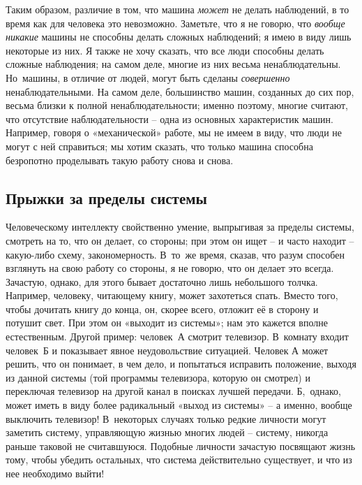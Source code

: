\documentclass[../main.tex]{subfiles}
\begin{document}
Таким образом, различие в том, что машина \emph{может} не делать наблюдений, в то время как для человека это невозможно. Заметьте, что я не говорю, что \emph{вообще никакие} машины не способны делать сложных наблюдений; я имею в виду лишь некоторые из них. Я также не хочу сказать, что все люди способны делать сложные наблюдения; на самом деле, многие из них весьма ненаблюдательны. Но~машины, в отличие от людей, могут быть сделаны \emph{совершенно} ненаблюдательными. На самом деле, большинство машин, созданных до сих пор, весьма близки к полной ненаблюдательности; именно поэтому, многие считают, что отсутствие наблюдательности \--- одна из основных характеристик машин. Например, говоря о «механической» работе, мы не имеем в виду, что люди не могут с ней справиться; мы хотим сказать, что только машина способна безропотно проделывать такую работу снова и снова.


\subsection{Прыжки за пределы системы}

Человеческому интеллекту свойственно умение, выпрыгивая за пределы системы, смотреть на то, что он делает, со стороны; при этом он ищет \--- и часто находит \--- какую-либо схему, закономерность. В~то~же время, сказав, что разум способен взглянуть на свою работу со стороны, я не говорю, что он делает это всегда. Зачастую, однако, для этого бывает достаточно лишь небольшого толчка. Например, человеку, читающему книгу, может захотеться спать. Вместо того, чтобы дочитать книгу до конца, он, скорее всего, отложит её в сторону и потушит свет. При этом он «выходит из системы»; нам это кажется вполне естественным. Другой пример: человек~А смотрит телевизор. В~комнату входит человек~Б и показывает явное неудовольствие ситуацией. Человек А может решить, что он понимает, в чем дело, и попытаться исправить положение, выходя из данной системы (той программы телевизора, которую он смотрел) и переключая телевизор на другой канал в поисках лучшей передачи. Б,~однако, может иметь в виду более радикальный «выход из системы» \--- а именно, вообще выключить телевизор! В~некоторых случаях только редкие личности могут заметить систему, управляющую жизнью многих людей \--- систему, никогда раньше таковой не считавшуюся. Подобные личности зачастую посвящают жизнь тому, чтобы убедить остальных, что система действительно существует, и что из нее необходимо выйти!
\end{document}
